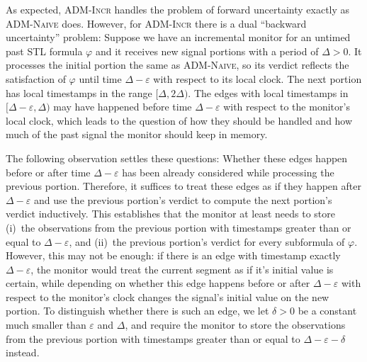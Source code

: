 As expected, \textsc{ADM-Incr} handles the problem of forward uncertainty exactly as \textsc{ADM-Naive} does.
However, for \textsc{ADM-Incr} there is a dual ``backward uncertainty'' problem:
Suppose we have an incremental monitor for an untimed past STL formula $\varphi$ and it receives new signal portions with a period of $\Delta > 0$.
It processes the initial portion the same as \textsc{ADM-Naive}, so its verdict reflects the satisfaction of $\varphi$ until time $\Delta - \varepsilon$ with respect to its local clock.
The next portion has local timestamps in the range $[\Delta, 2\Delta)$.
The edges with local timestamps in $[\Delta - \varepsilon, \Delta)$ may have happened before time $\Delta - \varepsilon$ with respect to the monitor's local clock, which leads to the question of how they should be handled and how much of the past signal the monitor should keep in memory.

The following observation settles these questions:
Whether these edges happen before or after time $\Delta - \varepsilon$ has been already considered while processing the previous portion.
Therefore, it suffices to treat these edges as if they happen after $\Delta - \varepsilon$ and use the previous portion's verdict to compute the next portion's verdict inductively.
This establishes that the monitor at least needs to store (i)~the observations from the previous portion with timestamps greater than or equal to $\Delta - \varepsilon$, and (ii)~the previous portion's verdict for every subformula of $\varphi$.
However, this may not be enough: if there is an edge with timestamp exactly $\Delta - \varepsilon$, the monitor would treat the current segment as if it's initial value is certain, while depending on whether this edge happens before or after $\Delta - \varepsilon$ with respect to the monitor's clock changes the signal's initial value on the new portion.
To distinguish whether there is such an edge, we let $\delta > 0$ be a constant much smaller than $\varepsilon$ and $\Delta$, and require the monitor to store the observations from the previous portion with timestamps greater than or equal to $\Delta - \varepsilon - \delta$ instead.


